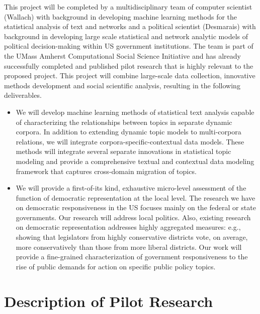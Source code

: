 This project will be completed by a multidisciplinary team of computer scientist (Wallach) with background in developing machine learning methods for the statistical analysis of text and networks and a political scientist (Desmarais) with background in developing large scale statistical and network analytic models of political decision-making within US government institutions. The team is part of the UMass Amherst Computational Social Science Initiative and has already successfully completed and published pilot research that is highly relevant to the proposed project. This project will combine large-scale data collection, innovative methods development and social scientific analysis, resulting in the following deliverables.

\begin{itemize}
\item We will develop machine learning methods of statistical text analysis capable of characterizing the relationships between topics in separate dynamic corpora. In addition to extending dynamic topic models to multi-corpora relations, we will integrate corpora-specific-contextual data models. These methods will integrate several separate innovations in statistical topic modeling and provide a comprehensive textual and contextual data modeling framework that captures cross-domain migration of topics. 
\item We will provide a first-of-its kind, exhaustive micro-level assessment of the function of  democratic representation at the local level. The research we have on democratic responsiveness in the US focuses mainly on the federal or state governments. Our research will address local politics. Also, existing research on democratic representation addresses highly aggregated measures: e.g., showing that legislators from highly conservative districts vote, on average, more conservatively than those from more liberal districts. Our work will provide a fine-grained characterization of government responsiveness to the rise of public demands for action on specific public policy topics.
\end{itemize}



\section{Description of Pilot Research}

